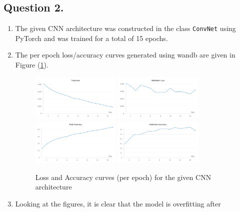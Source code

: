 \documentclass[10pt]{article}
\begin{document}
    \subsection*{\textbf{Question 2.}}
    \begin{enumerate}[label=(\alph*)]
        \item The given CNN architecture was constructed in the class \texttt{ConvNet} using PyTorch
        and was trained for a total of 15 epochs.
        \item The per epoch loss/accuracy curves generated using wandb are given in Figure
        (\ref{fig:convnet-loss-accuracy-curves}).
        \begin{figure}[h!]
            \centering
            \includegraphics[width=0.4\textwidth]{Assets/Classification/Convnet/01}
            \includegraphics[width=0.4\textwidth]{Assets/Classification/Convnet/02}
            \includegraphics[width=0.4\textwidth]{Assets/Classification/Convnet/03}
            \includegraphics[width=0.4\textwidth]{Assets/Classification/Convnet/04}
            \caption{Loss and Accuracy curves (per epoch) for the given CNN architecture}
            \label{fig:convnet-loss-accuracy-curves}
        \end{figure}
        \item Looking at the figures, it is clear that the model is overfitting after

\end{enumerate}
\end{document}
